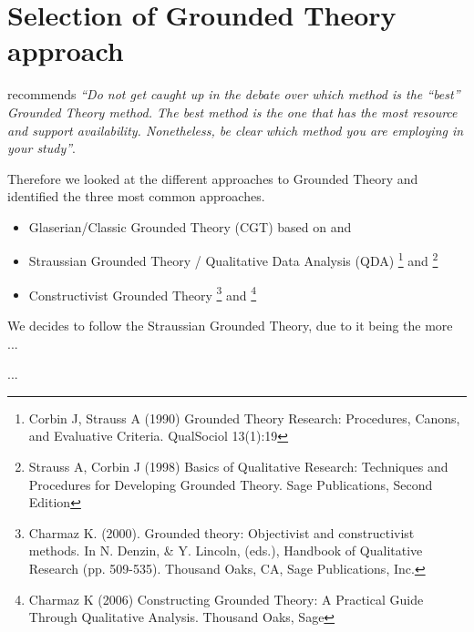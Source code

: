 \section{Selection of Grounded Theory approach}
\citet{Adolph-2011-GroundedTheory} recommends \textit{“Do not get caught up in the debate over which method is the “best” Grounded Theory method. The best method is the one that has the most resource and support availability. Nonetheless, be clear which method you are employing in your study”}.

Therefore we looked at the different approaches to Grounded Theory and identified the three most common approaches.
\begin{itemize}
	\item Glaserian/Classic Grounded Theory (CGT) based on \citet{Glaser-1967-GroundedTheory} and \citet{Glaser-1978-GroundedTheory}
	
	
	\item Straussian Grounded Theory / Qualitative Data Analysis (QDA)
	\footnote{Corbin J, Strauss A (1990) Grounded Theory Research: Procedures, Canons, and Evaluative Criteria. QualSociol 13(1):19}
	 and 
	 \footnote{Strauss A, Corbin J (1998) Basics of Qualitative Research: Techniques and Procedures for Developing  Grounded Theory. Sage Publications, Second Edition}
	
	\item Constructivist Grounded Theory
	\footnote{Charmaz K. (2000). Grounded theory: Objectivist and constructivist methods. In N. Denzin,  \& Y. Lincoln, (eds.), Handbook of Qualitative Research (pp. 509-535). Thousand Oaks, CA, Sage Publications, Inc.}
	 and 
	\footnote{Charmaz K (2006) Constructing Grounded Theory: A Practical Guide Through Qualitative Analysis. Thousand Oaks, Sage}
\end{itemize}

We decides to follow the Straussian Grounded Theory, due to it being the more ...

...






